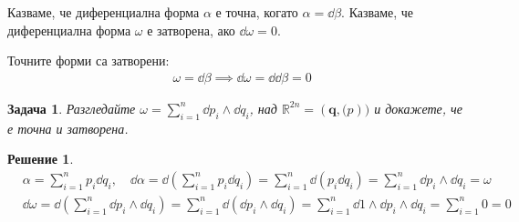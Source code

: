 \documentclass[12pt]{article}
\newtheorem{problem}{Задача}
\newtheorem*{solution*}{Решение}
\begin{document}
\begin{large}
\begin{comment}
\begin{problem}
Докажете, че $\dd \dd f = 0$
\end{problem}

\begin{solution*}
\begin{align*}
&\dd (\dd f) = \dd (\sum_{i=1}^{n} \pdv{f}{x_i} \dd x_i ) = \sum_{i=1}^{n} (\sum_{j=1}^{n} \pdv{f}{x_j, x_i} \dd x_j) \wedge \dd x_i = \sum_{i=1}^{n} \sum_{j\neq i} \pdv{f}{x_j, x_i} \dd x_j \wedge \dd x_i \\
&= \sum_{i=1}^{n} \sum_{j<i} \pdv{f}{x_j, x_i} \dd x_j \wedge \dd x_i + \sum_{i=1}^{n} \sum_{j>i} \pdv{f}{x_j, x_i} \dd x_j \wedge \dd x_i  \\
&= \sum_{i=1}^{n} \sum_{j<i} \pdv{f}{x_j, x_i} \dd x_j \wedge \dd x_i + \sum_{j=1}^{n} \sum_{i<j} \pdv{f}{x_j, x_i} \dd x_j \wedge \dd x_i \\
&= \sum_{i=1}^{n} \sum_{j<i} -\pdv{f}{x_j, x_i} \dd x_i \wedge \dd x_j + \sum_{i=1}^{n} \sum_{j<i} \pdv{f}{x_i, x_j} \dd x_i \wedge \dd x_j \\
&= \sum_{i=1}^{n} \sum_{j<i}(\pdv{f}{x_i, x_j}-\pdv{f}{x_j, x_i}) \dd x_i \wedge \dd x_j = 0 \text{(от теоремата на Шварц)}
\end{align*}
\end{solution*}
\end{comment}

Казваме, че диференциална форма $\alpha$ е точна, когато $\alpha=\dd \beta$.
Казваме, че диференциална форма $\omega$ е затворена, ако $\dd \omega=0$.

Точните форми са затворени:
\begin{align*}
  &\omega = \dd \beta \implies \dd \omega = \dd \dd \beta = 0
\end{align*}

\begin{problem}
  Разгледайте $\omega = \sum_{i=1}^n \dd p_i \wedge \dd q_i$, над $\mathbb{R}^{2n}=(\mathbf{q},\mathbf(p))$ и докажете, че е точна и затворена.
\end{problem}

\begin{solution*}
  \begin{align*}
    &\alpha = \sum_{i=1}^n p_i \dd q_i , \quad \dd \alpha =\dd(\sum_{i=1}^n p_i \dd q_i) = \sum_{i=1}^n \dd(p_i \dd q_i)
    = \sum_{i=1}^n \dd p_i \wedge \dd q_i = \omega \\
    &\dd \omega = \dd(\sum_{i=1}^n \dd p_i \wedge \dd q_i) =\sum_{i=1}^n \dd(\dd p_i \wedge \dd q_i) =
    \sum_{i=1}^n  \dd 1 \wedge \dd p_i \wedge \dd q_i = \sum_{i=1}^n 0 = 0
  \end{align*}
\end{solution*}


\end{large}
\end{document}
